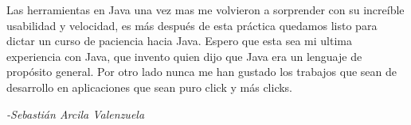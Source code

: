 Las herramientas en Java una vez mas me volvieron a sorprender con su
increíble usabilidad y velocidad, es más después de esta práctica
quedamos listo para dictar un curso de paciencia hacia Java. Espero
que esta sea mi ultima experiencia con Java, que invento quien dijo
que Java era un lenguaje de propósito general.
Por otro lado nunca me han gustado los trabajos que sean de desarrollo
en aplicaciones que sean puro click y más clicks.

\begin{flushright} 
	\itshape{-Sebastián Arcila Valenzuela}
\end{flushright}
